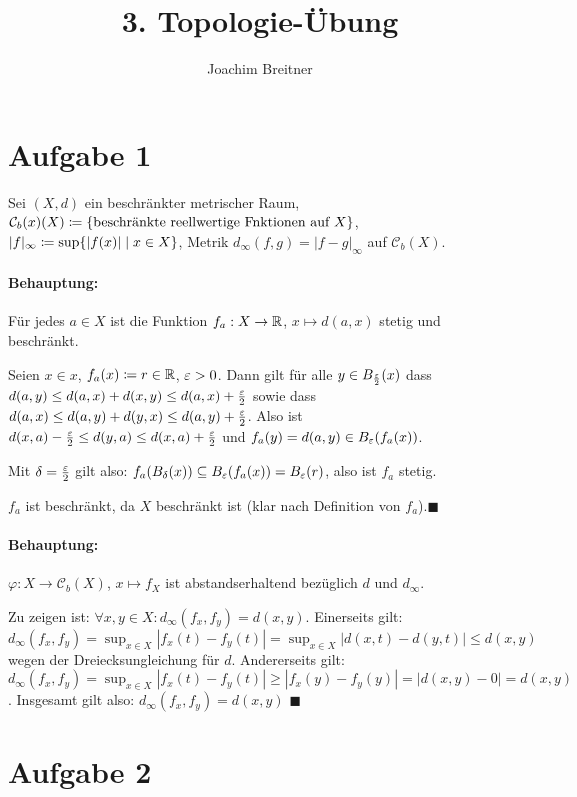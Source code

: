 \documentclass{article}
\title{3. Topologie-Übung}
\author{Joachim Breitner}
\begin{document}
\maketitle
\section*{Aufgabe 1}

Sei $(X, d)$ ein beschränkter metrischer Raum, $\mathcal C_b(x) (X) \da \{\text{beschränkte reellwertige Fnktionen auf $X$}\}$, $|f|_\infty \da \sup \{ |f(x)| \mid x \in X\}$, Metrik $d_\infty(f,g) = |f-g|_\infty$ auf $\mathcal C_b(X)$.

\paragraph{Behauptung:} Für jedes $a\in X$ ist die Funktion $f_a: X\to \mathbb{R}$, $x\mapsto d(a,x)$ stetig und beschränkt.

Seien $x\in x$, $f_a(x) \da r \in \MdR$, $\varepsilon > 0$. Dann gilt für alle $y\in B_{\frac{\varepsilon}2}(x)$ dass $d(a,y) \le d(a,x) + d(x,y) \le d(a,x) + \frac{\varepsilon}2$ sowie dass $d(a,x) \le d(a,y) + d(y,x) \le d(a,y) + \frac{\varepsilon}2$. Also ist $d(x,a)-\frac{\varepsilon}2 \le d(y,a) \le d(x,a) + \frac{\varepsilon}2$ und $f_a(y)= d(a,y) \in B_\varepsilon(f_a(x))$.

Mit $\delta = \frac{\varepsilon}2$ gilt also: $f_a(B_\delta(x)) \subseteq B_\varepsilon(f_a(x)) = B_\varepsilon(r)$, also ist $f_a$ stetig.

$f_a$ ist beschränkt, da $X$ beschränkt ist (klar nach Definition von $f_a$).\hfill$\blacksquare$

\paragraph{Behauptung:} $\varphi : X\to \mathcal C_b(X)$, $x\mapsto f_X$ ist abstandserhaltend bezüglich $d$ und $d_\infty$.

Zu zeigen ist: $\forall x,y\in X: d_\infty(f_x,f_y) = d(x,y)$. Einerseits gilt: $d_\infty(f_x,f_y) = \sup_{x\in X} | f_x(t) - f_y(t) | = \sup _{x\in X} |d(x,t) - d(y,t)| \le d(x,y)$ wegen der Dreiecksungleichung für $d$. Andererseits gilt: $d_\infty(f_x, f_y) = \sup_{x\in X} |f_x(t) - f_y(t)| \ge |f_x(y) - f_y(y)| = |d(x,y) - 0| = d(x,y)$. Insgesamt gilt also: $d_\infty(f_x,f_y) = d(x,y)$ \hfill$\blacksquare$

\section*{Aufgabe 2}
\end{document}
